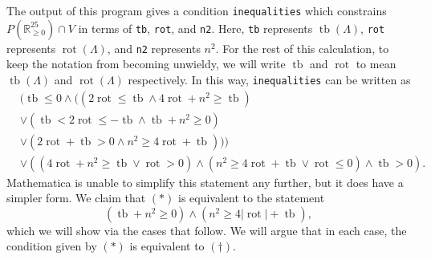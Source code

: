 \documentclass{article}
\DeclareMathOperator{\tb}{tb}
\DeclareMathOperator{\rot}{rot}
\newcommand{\R}{\mathbb{R}}
\begin{document}
The output of this program gives a condition \texttt{inequalities} which constrains $P(\R^{25}_{\geq0})\cap V$ in terms of \texttt{tb}, \texttt{rot}, and \texttt{n2}. Here, \texttt{tb} represents $\tb(\Lambda)$, \texttt{rot} represents $\rot(\Lambda)$, and \texttt{n2} represents $n^2$. For the rest of this calculation, to keep the notation from becoming unwieldy, we will write $\tb$ and $\rot$ to mean $\tb(\Lambda)$ and $\rot(\Lambda)$ respectively. In this way, \texttt{inequalities} can be written as
\begin{align*}
    &(\tb \leq 0 \wedge ((2 \rot \leq \tb \wedge 4 \rot + n^2 \geq \tb)\\
    &\vee (\tb < 2 \rot \leq -\tb \wedge \tb + n^2 \geq 0)\tag{$*$}\\
    &\vee (2 \rot + \tb > 0 \wedge n^2 \geq 4 \rot + \tb)))\\
    &\vee ((4 \rot + n^2 \geq \tb \vee 
     \rot > 0) \wedge (n^2 \geq 4 \rot + \tb \vee \rot \leq 0) \wedge \tb > 0).
\end{align*}
 Mathematica is unable to simplify this statement any further, but it does have a simpler form. We claim that $(*)$ is equivalent to the statement
\begin{equation*}
    (\tb+n^2\geq0)\wedge(n^2\geq4|\rot|+\tb),\tag{$\dagger$}
\end{equation*}
which we will show via the cases that follow. We will argue that in each case, the condition given by $(*)$ is equivalent to $(\dagger)$.
\end{document}
